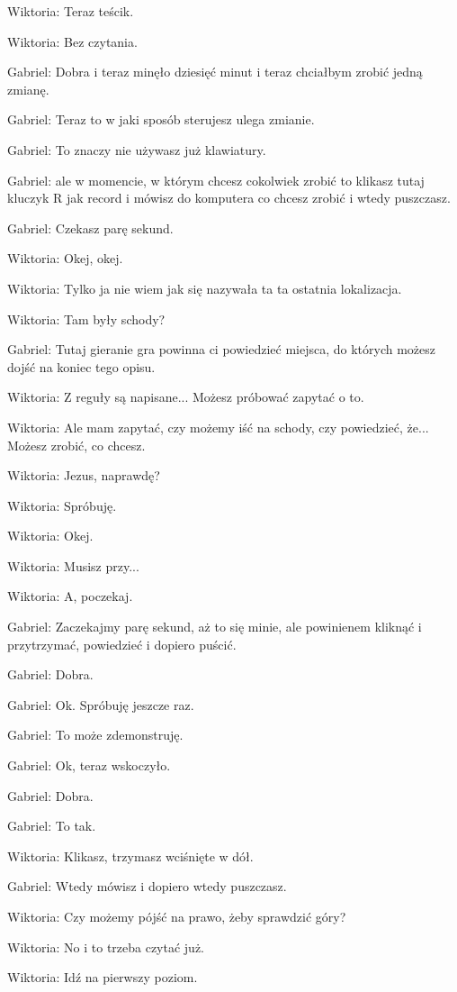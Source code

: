 Wiktoria: Teraz teścik.

Wiktoria: Bez czytania.

Gabriel: Dobra i teraz minęło dziesięć minut i teraz chciałbym zrobić jedną zmianę.

Gabriel: Teraz to w jaki sposób sterujesz ulega zmianie.

Gabriel: To znaczy nie używasz już klawiatury.

Gabriel: ale w momencie, w którym chcesz cokolwiek zrobić to klikasz tutaj kluczyk R jak record i mówisz do komputera co chcesz zrobić i wtedy puszczasz.

Gabriel: Czekasz parę sekund.

Wiktoria: Okej, okej.

Wiktoria: Tylko ja nie wiem jak się nazywała ta ta ostatnia lokalizacja.

Wiktoria: Tam były schody?

Gabriel: Tutaj gieranie gra powinna ci powiedzieć miejsca, do których możesz dojść na koniec tego opisu.

Wiktoria: Z reguły są napisane... Możesz próbować zapytać o to.

Wiktoria: Ale mam zapytać, czy możemy iść na schody, czy powiedzieć, że... Możesz zrobić, co chcesz.

Wiktoria: Jezus, naprawdę?

Wiktoria: Spróbuję.

Wiktoria: Okej.

Wiktoria: Musisz przy...

Wiktoria: A, poczekaj.

Gabriel: Zaczekajmy parę sekund, aż to się minie, ale powinienem kliknąć i przytrzymać, powiedzieć i dopiero puścić.

Gabriel: Dobra.

Gabriel: Ok. Spróbuję jeszcze raz.

Gabriel: To może zdemonstruję.

Gabriel: Ok, teraz wskoczyło.

Gabriel: Dobra.

Gabriel: To tak.

Wiktoria: Klikasz, trzymasz wciśnięte w dół.

Gabriel: Wtedy mówisz i dopiero wtedy puszczasz.

Wiktoria: Czy możemy pójść na prawo, żeby sprawdzić góry?

Wiktoria: No i to trzeba czytać już.

Wiktoria: Idź na pierwszy poziom.


